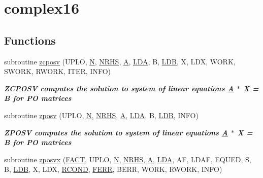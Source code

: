 \hypertarget{group__complex16POsolve}{}\section{complex16}
\label{group__complex16POsolve}
\subsection*{Functions}
\begin{DoxyCompactItemize}
\item 
subroutine \hyperlink{group__complex16POsolve_gae1f1548257a84b4328773c60eefb8934}{zcposv} (U\+P\+L\+O, \hyperlink{polmisc_8c_a0240ac851181b84ac374872dc5434ee4}{N}, \hyperlink{example__user_8c_aa0138da002ce2a90360df2f521eb3198}{N\+R\+H\+S}, \hyperlink{classA}{A}, \hyperlink{example__user_8c_ae946da542ce0db94dced19b2ecefd1aa}{L\+D\+A}, B, \hyperlink{example__user_8c_a50e90a7104df172b5a89a06c47fcca04}{L\+D\+B}, X, L\+D\+X, W\+O\+R\+K, S\+W\+O\+R\+K, R\+W\+O\+R\+K, I\+T\+E\+R, I\+N\+F\+O)
\begin{DoxyCompactList}\small\item\em {\bfseries  Z\+C\+P\+O\+S\+V computes the solution to system of linear equations \hyperlink{classA}{A} $\ast$ X = B for P\+O matrices} \end{DoxyCompactList}\item 
subroutine \hyperlink{group__complex16POsolve_ga58f7fd3a95eb2994b1caec327ec75895}{zposv} (U\+P\+L\+O, \hyperlink{polmisc_8c_a0240ac851181b84ac374872dc5434ee4}{N}, \hyperlink{example__user_8c_aa0138da002ce2a90360df2f521eb3198}{N\+R\+H\+S}, \hyperlink{classA}{A}, \hyperlink{example__user_8c_ae946da542ce0db94dced19b2ecefd1aa}{L\+D\+A}, B, \hyperlink{example__user_8c_a50e90a7104df172b5a89a06c47fcca04}{L\+D\+B}, I\+N\+F\+O)
\begin{DoxyCompactList}\small\item\em {\bfseries  Z\+P\+O\+S\+V computes the solution to system of linear equations \hyperlink{classA}{A} $\ast$ X = B for P\+O matrices} \end{DoxyCompactList}\item 
subroutine \hyperlink{group__complex16POsolve_gae86e9b8504b15462b291b17032195e29}{zposvx} (\hyperlink{superlu__enum__consts_8h_af00a42ecad444bbda75cde1b64bd7e72a1b6692b56d378abb85bd49063721d034}{F\+A\+C\+T}, U\+P\+L\+O, \hyperlink{polmisc_8c_a0240ac851181b84ac374872dc5434ee4}{N}, \hyperlink{example__user_8c_aa0138da002ce2a90360df2f521eb3198}{N\+R\+H\+S}, \hyperlink{classA}{A}, \hyperlink{example__user_8c_ae946da542ce0db94dced19b2ecefd1aa}{L\+D\+A}, A\+F, L\+D\+A\+F, E\+Q\+U\+E\+D, S, B, \hyperlink{example__user_8c_a50e90a7104df172b5a89a06c47fcca04}{L\+D\+B}, X, L\+D\+X, \hyperlink{superlu__enum__consts_8h_af00a42ecad444bbda75cde1b64bd7e72a9b5c151728d8512307565994c89919d5}{R\+C\+O\+N\+D}, \hyperlink{superlu__enum__consts_8h_af00a42ecad444bbda75cde1b64bd7e72a78fd14d7abebae04095cfbe02928f153}{F\+E\+R\+R}, B\+E\+R\+R, W\+O\+R\+K, R\+W\+O\+R\+K, I\+N\+F\+O)

\end{DoxyCompactItemize}

